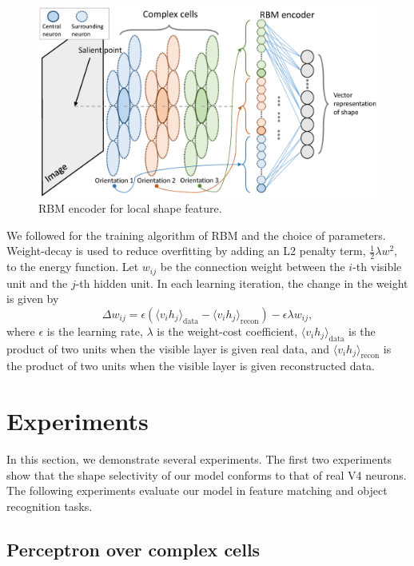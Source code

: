 \documentclass[twocolumn]{article}
\begin{document}
\begin{figure}
\centerline{\includegraphics[width=0.99\linewidth]{images/fig6.eps}} 
\caption{RBM encoder for local shape feature.}
\label{fig:6}
\end{figure}

We followed \cite{hinton2010} for the training algorithm of RBM and the choice of parameters.
Weight-decay is used to reduce overfitting by adding an L2 penalty term, $\frac{1}{2}\lambda w^2$, to the energy function.
Let $w_{ij}$ be the connection weight between the $i$-th visible unit and the $j$-th hidden unit.
In each learning iteration, the change in the weight is given by
\begin{equation}
\Delta w_{ij}=\epsilon\left(\langle v_i h_j\rangle_\text{data}-\langle v_i h_j\rangle_\text{recon}\right)
-\epsilon\lambda w_{ij},
\end{equation}
where $\epsilon$ is the learning rate, $\lambda$ is the weight-cost coefficient,
$\langle v_i h_j\rangle_\text{data}$ is the product of two units when the visible layer is given real data,
and $\langle v_i h_j\rangle_\text{recon}$ is the product of two units when the visible layer is given reconstructed data.

\section{Experiments}\label{sec:4}

In this section, we demonstrate several experiments.
The first two experiments show that the shape selectivity of our model conforms to that of real V4 neurons.
The following experiments evaluate our model in feature matching and object recognition tasks.

\subsection{Perceptron over complex cells}
\end{document}

